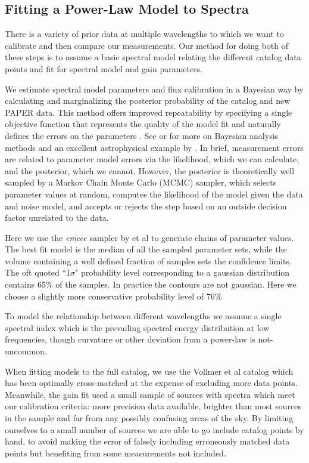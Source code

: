 \documentclass[preprint]{aastex}
\begin{document}
\subsection{Fitting a Power-Law Model to Spectra}
\label{sec:mcmc}

There is a variety of prior data at multiple wavelengths to which we want to calibrate
and then compare our measurements.  Our method for doing both of these steps
is to assume a basic spectral model relating the different catalog data points and
fit for spectral model and gain parameters. 

We estimate spectral model parameters and flux calibration in a
Bayesian way by calculating and marginalizing the posterior probability of the
catalog and new PAPER data.   This method
offers improved repeatability by specifying a single objective function that
represents the quality of the model fit and naturally defines the errors on the
parameters \citep{Hogg:2010p8759}.   See  \citet{Mackay:2003p9717}  or
\citet{Sivia:2006p9736} for more on Bayesian analysis methods and an excellent
astrophysical example by \cite{Press:1997p9783}. In brief, measurement errors
are related to parameter model errors via the likelihood, which we can calculate, 
and the posterior, which we cannot.  However, the posterior is theoretically
well sampled by a Markov Chain Monte Carlo (MCMC) sampler, which selects parameter
values at random, computes the likelihood of the model given the data and noise model,
and accepts or rejects the step based on an outside decision factor unrelated to the data.


Here we use the \emph{emcee} sampler by \citet{Mackay:2003p9717} et al to generate chains of
parameter values. The best fit model is the median of all the sampled
parameter sets, while the volume containing a well defined fraction of samples
sets the confidence limits.  The oft quoted ``1$\sigma$" probability level
corresponding to a gaussian distribution contains 65\% of the samples. In
practice the contours are not gaussian. Here we choose a slightly more
conservative probability level of 76\% 


To model the relationship between different wavelengths we assume a single spectral index
which is the prevailing spectral energy distribution at low frequencies, 
though curvature or other
deviation from a power-law is not-uncommon.  

When fitting models to the full catalog, we use the Vollmer et al
catalog which has been optimally cross-matched at the expense of excluding more data points.
Meanwhile, the gain fit used a small sample of
sources with spectra which meet our calibration criteria: more precision data available,
brighter than most sources in the sample and far from any possibly confusing areas of
the sky. 
By limiting ourselves to a small number of sources we are able to go include catalog points by hand,
to avoid making the error of falsely including erroneously matched 
data points but benefiting from some measurements not included. 
\end{document}
